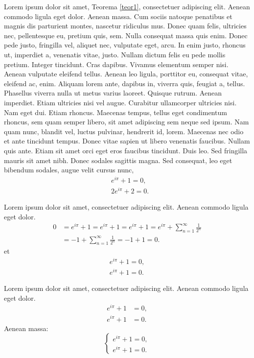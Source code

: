 \documentclass[a4paper,11pt,spanish, twoside, leqno]{tfg-uam}
\theoremstyle{definition}
\begin{document}
Lorem ipsum dolor sit amet, Teorema \ref{teor1}, consectetuer adipiscing elit. Aenean commodo ligula eget dolor. Aenean massa. Cum sociis natoque penatibus et magnis dis parturient montes, nascetur ridiculus mus. Donec quam felis, ultricies nec, pellentesque eu, pretium quis, sem. Nulla consequat massa quis enim. Donec pede justo, fringilla vel, aliquet nec, vulputate eget, arcu. In enim justo, rhoncus ut, imperdiet a, venenatis vitae, justo. Nullam dictum felis eu pede mollis pretium. Integer tincidunt. Cras dapibus. Vivamus elementum semper nisi. Aenean vulputate eleifend tellus. Aenean leo ligula, porttitor eu, consequat vitae, eleifend ac, enim. Aliquam lorem ante, dapibus in, viverra quis, feugiat a, tellus. Phasellus viverra nulla ut metus varius laoreet. Quisque rutrum. Aenean imperdiet. Etiam ultricies nisi vel augue. Curabitur ullamcorper ultricies nisi. Nam eget dui. Etiam rhoncus. Maecenas tempus, tellus eget condimentum rhoncus, sem quam semper libero, sit amet adipiscing sem neque sed ipsum. Nam quam nunc, blandit vel, luctus pulvinar, hendrerit id, lorem. Maecenas nec odio et ante tincidunt tempus. Donec vitae sapien ut libero venenatis faucibus. Nullam quis ante. Etiam sit amet orci eget eros faucibus tincidunt. Duis leo. Sed fringilla mauris sit amet nibh. Donec sodales sagittis magna. Sed consequat, leo eget bibendum sodales, augue velit cursus nunc,
\begin{align}\label{eq4}
&e^{i\pi }+1=0,
\\
&2e^{i\pi }+2=0.\label{eq5}
\end{align}

Lorem ipsum dolor sit amet, consectetuer adipiscing elit. Aenean commodo ligula eget dolor.
\begin{align}\nonumber
0&=e^{i\pi }+1=e^{i\pi }+1=e^{i\pi }+1=e^{i\pi }+\sum_{n=1}^\infty \frac{1}{2^n}
\\
&=-1+\sum_{n=1}^\infty \frac{1}{2^n}=-1+1=0.\label{eq6}
\end{align}
et
\begin{equation}\label{eq7}
\begin{aligned}
e^{i\pi }+1=0,
\\
e^{i\pi }+1=0.
\end{aligned}
\end{equation}


Lorem ipsum dolor sit amet, consectetuer adipiscing elit. Aenean commodo ligula eget dolor.
\begin{align*}
e^{i\pi }+1&=0,
\\
e^{i\pi }+1&=0.
\end{align*}
Aenean massa: 
\begin{equation}
\left\{
\begin{array}{l}
e^{i\pi }+1=0,
\\
e^{i\pi }+1=0.
\end{array}
\right.
\end{equation}
\end{document}
